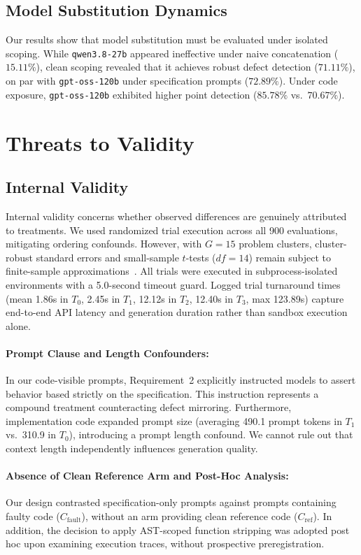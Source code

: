 \documentclass[11pt,a4paper]{article}
\begin{document}
\subsection{Model Substitution Dynamics}
Our results show that model substitution must be evaluated under isolated scoping. While \texttt{qwen3.8-27b} appeared ineffective under naive concatenation ($15.11\%$), clean scoping revealed that it achieves robust defect detection ($71.11\%$), on par with \texttt{gpt-oss-120b} under specification prompts ($72.89\%$). Under code exposure, \texttt{gpt-oss-120b} exhibited higher point detection ($85.78\%$ vs.\ $70.67\%$).


\section{Threats to Validity}
\label{sec:threats}

\subsection{Internal Validity}
Internal validity concerns whether observed differences are genuinely attributed to treatments. We used randomized trial execution across all 900 evaluations, mitigating ordering confounds. However, with $G=15$ problem clusters, cluster-robust standard errors and small-sample $t$-tests ($df=14$) remain subject to finite-sample approximations~\cite{cameron2015practitioner}. All trials were executed in subprocess-isolated environments with a 5.0-second timeout guard. Logged trial turnaround times (mean 1.86s in $T_0$, 2.45s in $T_1$, 12.12s in $T_2$, 12.40s in $T_3$, max 123.89s) capture end-to-end API latency and generation duration rather than sandbox execution alone.

\paragraph{Prompt Clause and Length Confounders:}
In our code-visible prompts, Requirement~2 explicitly instructed models to assert behavior based strictly on the specification. This instruction represents a compound treatment counteracting defect mirroring. Furthermore, implementation code expanded prompt size (averaging 490.1 prompt tokens in $T_1$ vs.\ 310.9 in $T_0$), introducing a prompt length confound. We cannot rule out that context length independently influences generation quality.

\paragraph{Absence of Clean Reference Arm and Post-Hoc Analysis:}
Our design contrasted specification-only prompts against prompts containing faulty code ($C_{\text{fault}}$), without an arm providing clean reference code ($C_{\text{ref}}$). In addition, the decision to apply AST-scoped function stripping was adopted post hoc upon examining execution traces, without prospective preregistration.
\end{document}
